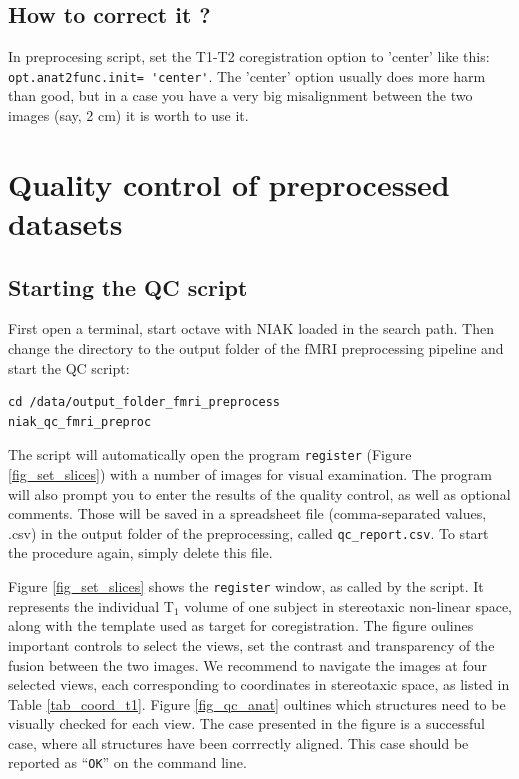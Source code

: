 \documentclass[12pt]{paper}%
\begin{document}
\subsection*{How to correct it ?}
In preprocesing script, set the T1-T2 coregistration option to 'center' like this: \lstinline|opt.anat2func.init= 'center'|. The 'center' option usually does more harm than good, but in a case you have a very big misalignment between the two images (say, 2 cm) it is worth to use it.

\newpage
\section{Quality control of preprocessed datasets}

\subsection{Starting the QC script}

First open a terminal, start octave with NIAK loaded in the search path. Then change the directory to the output folder of the fMRI preprocessing pipeline and start the QC script:

\begin{lstlisting}
cd /data/output_folder_fmri_preprocess
niak_qc_fmri_preproc
\end{lstlisting}

The script will automatically open the program \texttt{register} (Figure \ref{fig_set_slices}) with a number of images for visual examination. The program will also prompt you to enter the results of the quality control, as well as optional comments. Those will be saved in a spreadsheet file (comma-separated values, .csv) in the output folder of the preprocessing, called \texttt{qc\_report.csv}. To start the procedure again, simply delete this file.

Figure \ref{fig_set_slices} shows the \texttt{register} window, as called by the script. It represents the individual T$_1$ volume of one subject in stereotaxic non-linear space, along with the template used as target for coregistration. The figure oulines important controls to select the views, set the contrast and transparency of the fusion between the two images. We recommend to navigate the images at four selected views, each corresponding to coordinates in stereotaxic space, as listed in Table \ref{tab_coord_t1}. Figure \ref{fig_qc_anat} oultines which structures need to be visually checked for each view. The case presented in the figure is a successful case, where all structures have been corrrectly aligned. This case should be reported as ``\texttt{OK}'' on the command line.
\end{document}
